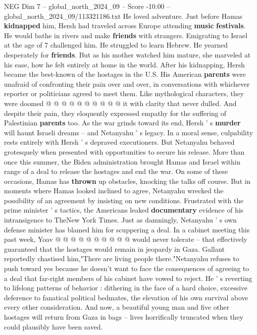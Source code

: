 \begin{textsample}{NEG Dim 7 – global\_north\_2024\_09 – Score -10.00 – global\_north\_2024\_09/113321186.txt}
He loved adventure.
Just before Hamas \textbf{kidnapped} him, Hersh had traveled across Europe attending \textbf{music} \textbf{festivals}.
He would bathe in rivers and make \textbf{friends} with strangers.
Emigrating to Israel at the age of 7 challenged him.
He struggled to learn Hebrew.
He yearned desperately for \textbf{friends}.
But as his mother watched him mature, she marveled at his ease, how he felt entirely at home in the world.
After his kidnapping, Hersh became the best-known of the hostages in the U.S.
His American \textbf{parents} were unafraid of confronting their pain over and over, in conversations with whichever reporter or politicians agreed to meet them.
Like mythological characters, they were doomed @ @ @ @ @ @ @ @ @ @ it with clarity that never dulled.
And despite their pain, they eloquently expressed empathy for the suffering of Palestinian \textbf{parents} too.
As the war grinds toward its end, Hersh ' s \textbf{murder} will haunt Israeli dreams -- and Netanyahu ' s legacy.
In a moral sense, culpability rests entirely with Hersh ' s depraved executioners.
But Netanyahu behaved grotesquely when presented with opportunities to secure his release.
More than once this summer, the Biden administration brought Hamas and Israel within range of a deal to release the hostages and end the war.
On some of these occasions, Hamas has \textbf{thrown} up obstacles, knocking the talks off course.
But in moments where Hamas looked inclined to agree, Netanyahu wrecked the possibility of an agreement by insisting on new conditions.
Frustrated with the prime minister ' s tactics, the Americans leaked \textbf{documentary} evidence of his intransigence to TheNew York Times.
Just as damningly, Netanyahu ' s own defense minister has blamed him for scuppering a deal.
In a cabinet meeting this past week, Yoav @ @ @ @ @ @ @ @ @ @ would never tolerate -- that effectively guaranteed that the hostages would remain in jeopardy in Gaza.
Gallant reportedly chastised him,"There are living people there."Netanyahu refuses to push toward yes because he doesn't want to face the consequences of agreeing to a deal that far-right members of his cabinet have vowed to reject.
He ' s reverting to lifelong patterns of behavior : dithering in the face of a hard choice, excessive deference to fanatical political bedmates, the elevation of his own survival above every other consideration.
And now, a beautiful young man and five other hostages will return from Gaza in bags -- lives horrifically truncated when they could plausibly have been saved.

\end{textsample}

